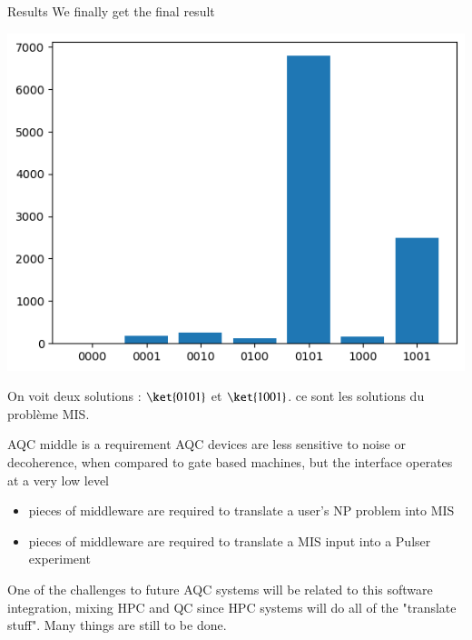 \begin{frame}{Results}
We finally get the final result
\begin{center}
\includegraphics[scale=0.5]{images/histo1.png}
\end{center}
On voit deux solutions : $\ket{0101}$ et $\ket{1001}$. ce sont les solutions du problème MIS.
\end{frame}

\begin{frame}{AQC middle is a requirement}
AQC devices are less sensitive to noise or decoherence, when compared to gate based machines, but the interface operates
at a very low level
\begin{itemize}
    \item pieces of middleware are required to translate a user's NP problem into MIS
    \item pieces of middleware are required to translate a MIS input into a Pulser experiment
\end{itemize}
One of the challenges to future AQC systems will be related to this software integration, mixing HPC and QC since
HPC systems will do all of the "translate stuff". Many things are still to be done. 
\end{frame}

